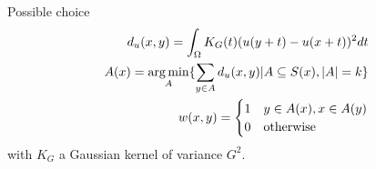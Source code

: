 Possible choice
\begin{align}
  \label{eq:109}
  d_{u}(x, y) = \int_{\Omega} K_{G}(t) (u(y + t) - u(x+t))^{2} dt  \\
  A(x) = \operatorname*{arg\,min}_{A} \{ \sum_{y \in A} d_{u}(x, y) | A \subseteq S(x),
  |A| = k \} \\
  w(x, y) =
  \begin{cases}
    1 & y \in A(x), x \in A(y) \\
    0 & \text{otherwise}
  \end{cases}
\end{align} with $K_{G}$ a Gaussian kernel of variance $G^{2}$.


